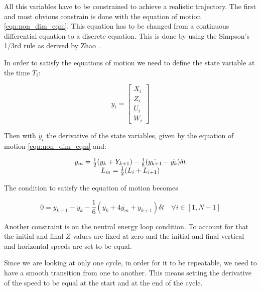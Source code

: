 \par All this variables have to be constrained to achieve a realistic trajectory.
The first and most obvious constrain is done with the equation of motion \ref{eqn:non_dim_eqm}.
This equation has to be changed from a continuous differential equation to a discrete equation.
This is done by using the Simpson's 1/3rd rule as derived by Zhao \cite{zhao2004optimal}.

In order to satisfy the equations of motion we need to define the state variable at the time $T_i$:

\begin{equation}
  y_i= \begin{bmatrix}
    X_i \\
    Z_i \\
    U_i \\
    W_i 
  \end{bmatrix}
  \label{eqn:state_i}
\end{equation}

Then with $\dot{y_i}$ the derivative of the state variables, given by the equation of motion \ref{eqn:non_dim_eqm} and:

\begin{equation}
  \begin{array}[c]{c}
    y_m= \frac{1}{2}(y_k + Y_{k+1}) - \frac{1}{8}(\dot{y_{k+1}} - \dot{y_k})\delta t \\
    L_m=\frac{1}{2}(L_i + L_{i+1})
  \end{array}
  \label{eqn:simpson_middle}
\end{equation}

The condition to satisfy the equation of motion becomes

\begin{equation}
  0=y_{k+1} - y_k - \frac{1}{6}( \dot{y_k} + 4 \dot{y_m} + \dot{y_{k+1}})\delta t \quad \forall i \in [1,N-1]
  \label{eqn:simpson}
\end{equation}

\par Another constraint is on the neutral energy loop condition.
To account for that the initial and final $Z$ values are fixed at zero and the initial and final vertical and horizontal speeds are set to be equal.

\par Since we are looking at only one cycle, in order for it to be repeatable, we need to have a smooth transition from one to another.
This  means setting the derivative of the speed to be equal at the start and at the end of the cycle.

